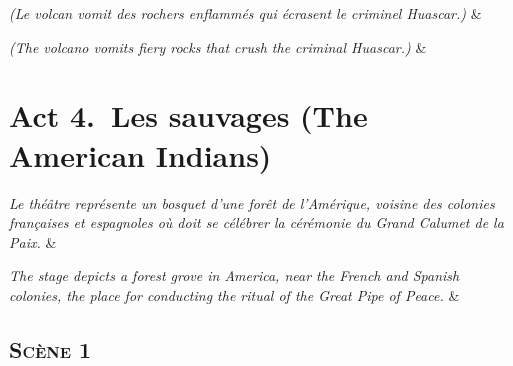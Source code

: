 \documentclass{article}
\newcommand{\stage}[1]{\hfill\emph{(#1)}\hfill}
\newcommand{\scene}[1]{\emph{#1}\hfill}
\begin{document}
\begin{pairs}
\begin{Leftside}
	\stanza
		\stage{Le volcan vomit des rochers enflamm\'{e}s qui \'{e}crasent le criminel Huascar.}
    \& 
    \endnumbering
\end{Leftside}
\begin{Rightside}
	\stanza
		\stage{The volcano vomits fiery rocks that crush the criminal Huascar.}
    \& 
    \endnumbering
\end{Rightside} 
\Columns 
\end{pairs}

% 

\newpage

\section*{Act 4.~Les sauvages (The American Indians)}

\begin{pairs}
\begin{Leftside}
	\stanza
		\scene{Le th\'{e}\^{a}tre repr\'{e}sente un bosquet d'une for\^{e}t de l'Am\'{e}rique, voisine des colonies fran\c{c}aises et espagnoles o\`{u} doit se c\'{e}l\'{e}brer la c\'{e}r\'{e}monie du Grand Calumet de la Paix.}
	\& 
	\endnumbering
\end{Leftside}
\begin{Rightside}
	\stanza
		\scene{The stage depicts a forest grove in America, near the French and Spanish colonies, the place for conducting the ritual of the Great Pipe of Peace.}
	\&
	\endnumbering
\end{Rightside} 
\Columns 
\end{pairs}

\subsection*{\textsc{Sc\`{e}ne 1}}
\end{document}
